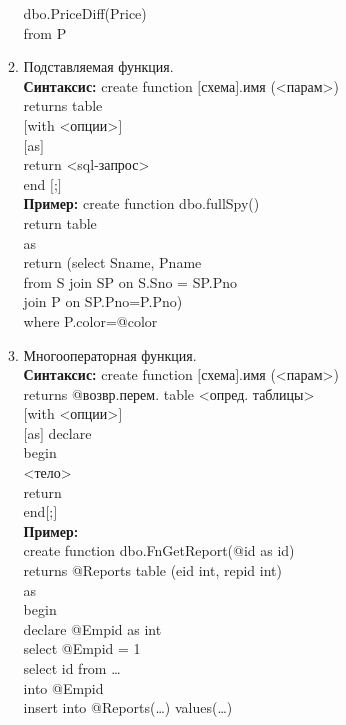 \begin{enumerate}
\begin{enumerate}
		            dbo.PriceDiff(Price)\\
		            from P
		      \item Подставляемая функция.\\
		            \textbf{Синтаксис:}
		            create function $[$схема$]$.имя (<парам>)\\
		            returns table\\
		            $[$with <опции>$]$\\
		            $[$as$]$\\
		            return <sql-запрос>\\
		            end $[$;$]$\\
		            \textbf{Пример:}
		            create function dbo.fullSpy()\\
		            return table\\
		            as\\
		            return (select Sname, Pname\\
		            from S join SP on S.Sno = SP.Pno\\
		            join P on SP.Pno=P.Pno)\\
		            where P.color=@color
		      \item  Многооператорная функция.\\
		            \textbf{Синтаксис:}
		            create function $[$схема$]$.имя (<парам>)\\
		            returns @возвр.перем. table <опред. таблицы>\\
		            $[$with <опции>$]$\\
		            $[$as$]$ declare\\
		            begin\\
		            <тело>\\
		            return\\
		            end$[$;$]$\\
		            \textbf{Пример:}\\
		            create function dbo.FnGetReport(@id as id)\\
		            returns @Reports table (eid int, repid int)\\
		            as\\
		            begin\\
		            declare @Empid as int\\
		            select @Empid = 1\\
		            select id from \dots\\
		            into @Empid\\
		            insert into @Reports(\dots) values(\dots)
	      \end{enumerate}
\end{enumerate}
